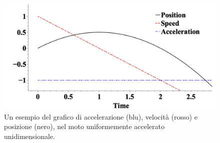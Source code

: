 \begin{figure}[htbp]
    \begin{center}
        \includegraphics[width=13cm]{images/MRUA.png} 
        \caption{Un esempio del grafico di accelerazione (blu), velocità
        (rosso) e posizione (nero), nel moto uniformemente accelerato
        unidimensionale.}       
    \end{center}
\label{fig:MRUA}
\end{figure}
